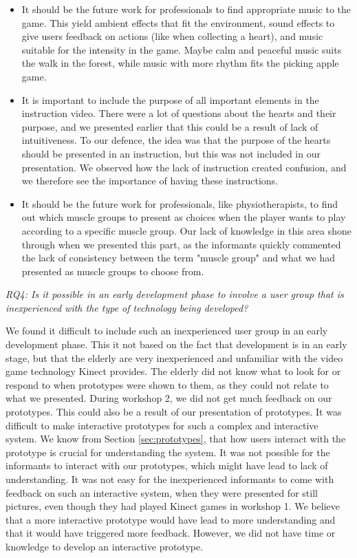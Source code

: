 \begin{itemize}
\item It should be the future work for professionals to find appropriate music to the game. This yield ambient effects that fit the environment, sound effects to give users feedback on actions (like when collecting a heart), and music suitable for the intensity in the game. Maybe calm and peaceful music suits the walk in the forest, while music with more rhythm fits the picking apple game. 
\item It is important to include the purpose of all important elements in the instruction video. There were a lot of questions about the hearts and their purpose, and we presented earlier that this could be a result of lack of intuitiveness. To our defence, the idea was that the purpose of the hearts should be presented in an instruction, but this was not included in our presentation. We observed how the lack of instruction created confusion, and we therefore see the importance of having these instructions.  
\item It should be the future work for professionals, like physiotherapists, to find out which muscle groups to present as choices when the player wants to play according to a specific muscle group. Our lack of knowledge in this area shone through when we presented this part, as the informants quickly commented the lack of consistency between the term "muscle group" and what we had presented as muscle groups to choose from. 
\end{itemize}

\emph{RQ4: Is it possible in an early development phase to involve a user group that is inexperienced with the type of technology being developed?}

We found it difficult to include such an inexperienced user group in an early development phase. This it not based on the fact that development is in an early stage, but that the elderly are very inexperienced and unfamiliar with the video game technology Kinect provides. The elderly did not know what to look for or respond to when prototypes were shown to them, as they could not relate to what we presented. During workshop 2, we did not get much feedback on our prototypes. This could also be a result of our presentation of prototypes. It was difficult to make interactive prototypes for such a complex and interactive system. We know from Section \ref{sec:prototypes}, that how users interact with the prototype is crucial for understanding the system. It was not possible for the informants to interact with our prototypes, which might have lead to lack of understanding. It was not easy for the inexperienced informants to come with feedback on such an interactive system, when they were presented for still pictures, even though they had played Kinect games in workshop 1. We believe that a more interactive prototype would have lead to more understanding and that it would have triggered more feedback. However, we did not have time or knowledge to develop an interactive prototype. 
 
